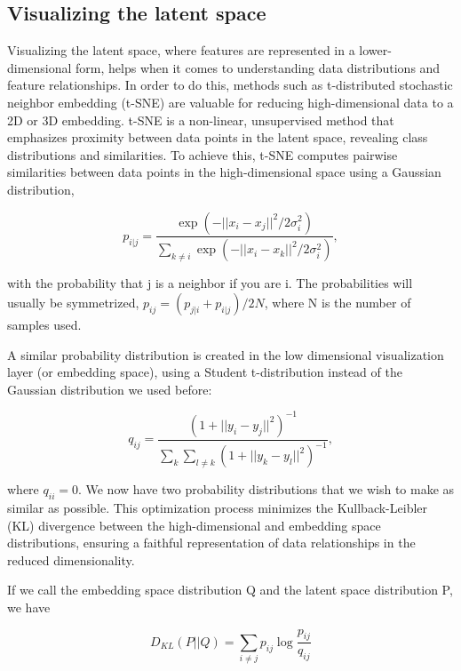 \subsection{Visualizing the latent space}




Visualizing the latent space, where features are represented in a lower-dimensional form, helps when it comes to understanding data distributions and feature relationships. In order to do this, methods such as t-distributed stochastic neighbor embedding (t-SNE) are valuable for reducing high-dimensional data to a 2D or 3D embedding. t-SNE is a non-linear, unsupervised method that emphasizes proximity between data points in the latent space, revealing class distributions and similarities. To achieve this, t-SNE computes pairwise similarities between data points in the high-dimensional space using a Gaussian distribution, 

\begin{equation}
    p_{i|j}=\frac{\exp (-||x_i-x_j||^2/2\sigma_i^2)}{\sum_{k\neq i}\exp(-||x_i-x_k||^2/2\sigma_i^2)},
\end{equation}

with the probability that j is a neighbor if you are i. The probabilities will usually be symmetrized, $p_{ij}=(p_{j|i}+p_{i|j})/2N$, where N is the number of samples used. 

A similar probability distribution is created in the low dimensional visualization layer (or embedding space), using a Student t-distribution instead of the Gaussian distribution we used before: 

\begin{equation}
    q_{ij}=\frac{(1+||y_i-y_j||^2)^{-1}}{\sum_k\sum_{l\neq k}(1+||y_k-y_l||^2)^{-1}},
\end{equation}

where $q_{ii}=0$. We now have two probability distributions that we wish to make as similar as possible. This optimization process minimizes the Kullback-Leibler (KL) divergence between the high-dimensional and embedding space distributions, ensuring a faithful representation of data relationships in the reduced dimensionality.


If we call the embedding space distribution Q and the latent space distribution P, we have

\begin{equation}
    D_{KL}(P||Q)=\sum_{i\neq j}p_{ij}\log\frac{p_{ij}}{q_{ij}}
\end{equation}

